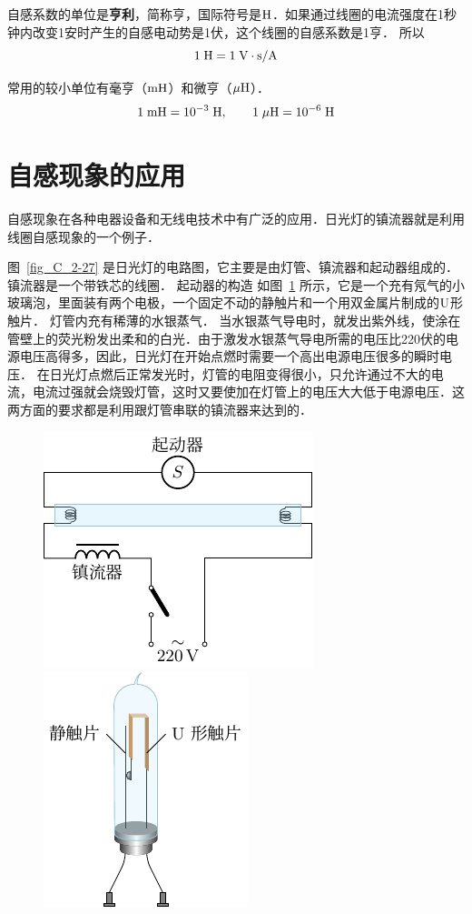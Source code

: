 自感系数的单位是\textbf{亨利}，简称亨，国际符号是$\text{H}
$．如果通过线圈的电流强度在1秒钟内改变1安时产生的自感电动势是1伏，这个线圈的自感系数是1亨．
所以
\[1 \;\text{H} =1 \;\text{V}\cdot\text{s}/\text{A}\]

常用的较小单位有毫亨（$ \text{mH} $）和微亨（$\mu\text{H}$）．
\[1 \;\text{mH} =10^{-3}\;\text{H},\qquad 1\;\mu\text{H}=10^{-6} \;\text{H}  \]

\section{自感现象的应用}
自感现象在各种电器设备和无线电技术中有广泛的应用．日光灯的镇流器就是利用线圈自感现象的一个例子．

图~\ref{fig_C_2-27} 是日光灯的电路图，它主要是由灯管、镇流器和起动器组成的．
镇流器是一个带铁芯的线圈．
起动器的构造
如图~\ref{fig_C_2-28} 所示，它是一个充有氖气的小玻璃泡，里面装有两个电极，一个固定不动的静触片和一个用双金属片制成的$\rm{U}$形触片．
灯管内充有稀薄的水银蒸气．
当水银蒸气导电时，就发出紫外线，使涂在管壁上的荧光粉发出柔和的白光．由于激发水银蒸气导电所需的电压比220伏的电源电压高得多，因此，日光灯在开始点燃时需要一个高出电源电压很多的瞬时电压．
在日光灯点燃后正常发光时，灯管的电阻变得很小，只允许通过不大的电流，电流过强就会烧毁灯管，这时又要使加在灯管上的电压大大低于电源电压．这两方面的要求都是利用跟灯管串联的镇流器来达到的．
\begin{figure}[htbp]
    \centering
    \begin{minipage}[t]{0.48\textwidth}
        \centering
        \includegraphics{fig/C/2-27.pdf}
        \caption{}\label{fig_C_2-27}
    \end{minipage}
    \begin{minipage}[t]{0.48\textwidth}
        \centering
        \includegraphics{fig/C/2-28.pdf}
        \caption{}\label{fig_C_2-28}
    \end{minipage}
\end{figure}

